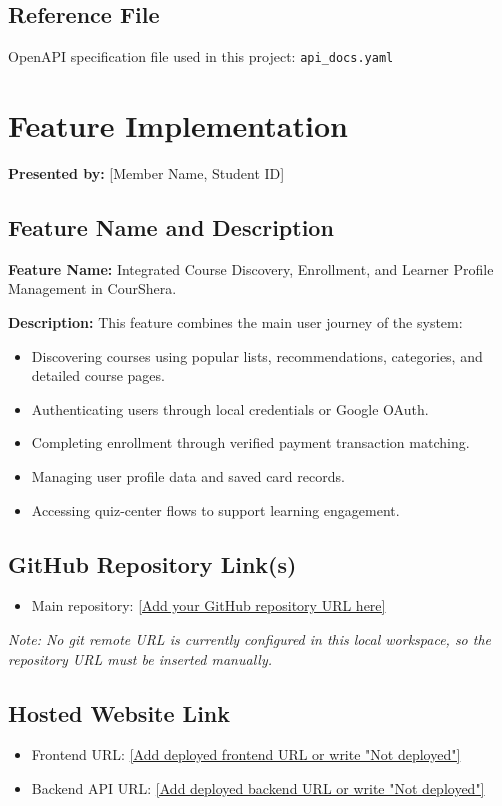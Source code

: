 \documentclass[12pt,a4paper]{report}
\begin{document}
\section{Reference File}
OpenAPI specification file used in this project: \texttt{api\_docs.yaml}

\clearpage

\chapter{Feature Implementation}

\textbf{Presented by:} [Member Name, Student ID]

\section{Feature Name and Description}
\textbf{Feature Name:} Integrated Course Discovery, Enrollment, and Learner Profile Management in CourShera.

\textbf{Description:}
This feature combines the main user journey of the system:
\begin{itemize}[leftmargin=*]
  \item Discovering courses using popular lists, recommendations, categories, and detailed course pages.
  \item Authenticating users through local credentials or Google OAuth.
  \item Completing enrollment through verified payment transaction matching.
  \item Managing user profile data and saved card records.
  \item Accessing quiz-center flows to support learning engagement.
\end{itemize}

\section{GitHub Repository Link(s)}
\begin{itemize}[leftmargin=*]
  \item Main repository: \url{[Add your GitHub repository URL here]}
\end{itemize}

\textit{Note: No git remote URL is currently configured in this local workspace, so the repository URL must be inserted manually.}

\section{Hosted Website Link}
\begin{itemize}[leftmargin=*]
  \item Frontend URL: \url{[Add deployed frontend URL or write "Not deployed"]}
  \item Backend API URL: \url{[Add deployed backend URL or write "Not deployed"]}
\end{itemize}
\end{document}
